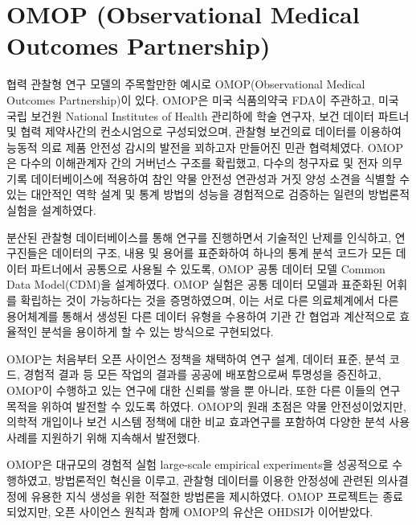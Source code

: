 \documentclass[10.5pt]{book}
\theoremstyle{definition}
\theoremstyle{definition}
\theoremstyle{definition}
\theoremstyle{remark}
\begin{document}
\section{OMOP (Observational Medical Outcomes
Partnership)}\label{omop-observational-medical-outcomes-partnership}

협력 관찰형 연구 모델의 주목할만한 예시로 OMOP(Observational Medical
Outcomes Partnership)이 있다. OMOP은 미국 식품의약국 FDA이 주관하고,
미국 국립 보건원 National Institutes of Health 관리하에 학술 연구자,
보건 데이터 파트너 및 협력 제약사간의 컨소시엄으로 구성되었으며, 관찰형
보건의료 데이터를 이용하여 능동적 의료 제품 안전성 감시의 발전을
꾀하고자 만들어진 민관 협력체였다. \citep{stang2010omop} OMOP은 다수의
이해관계자 간의 거버넌스 구조를 확립했고, 다수의 청구자료 및 전자 의무
기록 데이터베이스에 적용하여 참인 약물 안전성 연관성과 거짓 양성 소견을
식별할 수 있는 대안적인 역학 설계 및 통계 방법의 성능을 경험적으로
검증하는 일련의 방법론적 실험을 설계하였다.

분산된 관찰형 데이터베이스를 통해 연구를 진행하면서 기술적인 난제를
인식하고, 연구진들은 데이터의 구조, 내용 및 용어를 표준화하여 하나의
통계 분석 코드가 모든 데이터 파트너에서 공통으로 사용될 수 있도록, OMOP
공통 데이터 모델 Common Data Model(CDM)을 설계하였다.
\citep{overhage2012cdm} OMOP 실험은 공통 데이터 모델과 표준화된 어휘를
확립하는 것이 가능하다는 것을 증명하였으며, 이는 서로 다른 의료체계에서
다른 용어체계를 통해서 생성된 다른 데이터 유형을 수용하여 기관 간 협업과
계산적으로 효율적인 분석을 용이하게 할 수 있는 방식으로 구현되었다.

OMOP는 처음부터 오픈 사이언스 정책을 채택하여 연구 설계, 데이터 표준,
분석 코드, 경험적 결과 등 모든 작업의 결과를 공공에 배포함으로써
투명성을 증진하고, OMOP이 수행하고 있는 연구에 대한 신뢰를 쌓을 뿐
아니라, 또한 다른 이들의 연구 목적을 위하여 발전할 수 있도록 하였다.
OMOP의 원래 초점은 약물 안전성이었지만, 의학적 개입이나 보건 시스템
정책에 대한 비교 효과연구를 포함하여 다양한 분석 사용사례를 지원하기
위해 지속해서 발전했다.

OMOP은 대규모의 경험적 실험 large-scale empirical experiments을
성공적으로 수행하였고, \citep{ryan2012omop, ryan2013omop} 방법론적인
혁신을 이루고, \citep{schuemie_2014} 관찰형 데이터를 이용한 안정성에
관련된 의사결정에 유용한 지식 생성을 위한 적절한 방법론을 제시하였다.
\citep{madigan_2013, madigan2013design} OMOP 프로젝트는 종료되었지만,
오픈 사이언스 원칙과 함께 OMOP의 유산은 OHDSI가 이어받았다.
\end{document}
